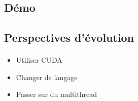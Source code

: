 \subsection{Démo}

\begin{frame}[fragile=singleslide]{\insertsectionhead}
  \framesubtitle{\insertsubsectionhead}
  \begin{figure}
    \begin{subfigure}{0.4\textwidth}
    \end{subfigure}
  \end{figure}
\end{frame}

\subsection{Perspectives d'évolution}

\begin{frame}[fragile=singleslide]{\insertsectionhead}
  \framesubtitle{\insertsubsectionhead}
  \begin{itemize}
    \item Utiliser CUDA
  \end{itemize}
  \hfill
  \begin{itemize}
    \item Changer de langage
  \end{itemize}
  \hfill
  \begin{itemize}
    \item Passer sur du multithread
  \end{itemize}
\end{frame}

